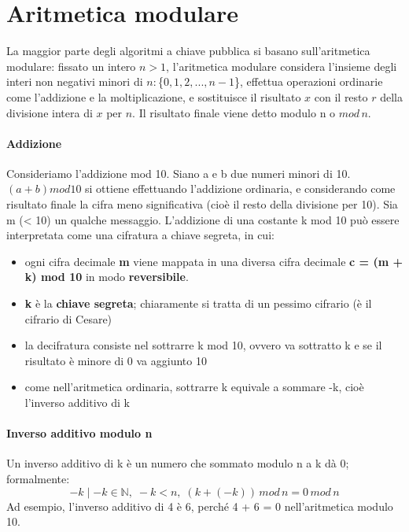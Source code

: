 \section{Aritmetica modulare}
La maggior parte degli algoritmi a chiave pubblica si basano sull'aritmetica modulare: fissato un intero $ n>1 $, l'aritmetica modulare considera l'insieme degli interi non negativi minori di
$n: $\{$0, 1, 2,..., n-1$\}, effettua operazioni ordinarie come l'addizione e la moltiplicazione, e sostituisce il risultato $x$ con il resto $r$ della divisione intera di $x$ per $n$. Il risultato finale viene detto modulo n o $mod \, n$. \\

\paragraph{Addizione}
Consideriamo l'addizione mod 10. Siano a e b due numeri minori di 10. $(a + b)mod10$ si ottiene effettuando l'addizione ordinaria, e considerando come risultato finale la cifra meno significativa (cioè il resto della divisione per 10). 
\newline \newline
Sia m (< 10) un qualche messaggio. L'addizione di una costante k mod 10 può essere interpretata come una cifratura a chiave segreta, in cui:
\begin{itemize}
\item ogni cifra decimale \textbf{m} viene mappata in una diversa cifra decimale \textbf{c = (m + k) mod 10} in modo \textbf{reversibile}.
\item \textbf{k} è la \textbf{chiave segreta}; chiaramente si tratta di un pessimo cifrario (è il cifrario di Cesare)
\item la decifratura consiste nel sottrarre k mod 10, ovvero va sottratto k e se il risultato è minore di 0 va aggiunto 10
\item come nell’aritmetica ordinaria, sottrarre k equivale a sommare -k, cioè l’inverso additivo di k
\end{itemize}

\paragraph{Inverso additivo modulo n}
Un inverso additivo di k è un numero che sommato modulo n a k dà 0; formalmente: 
\begin{equation}
-k \mid -k \in \mathbb{N},\; -k < n,\; (k + (-k)) \, mod \, n = 0 \, mod \, n
\end{equation}
Ad esempio, l’inverso additivo di 4 è 6, perché 4 + 6 = 0 nell'aritmetica modulo 10.

